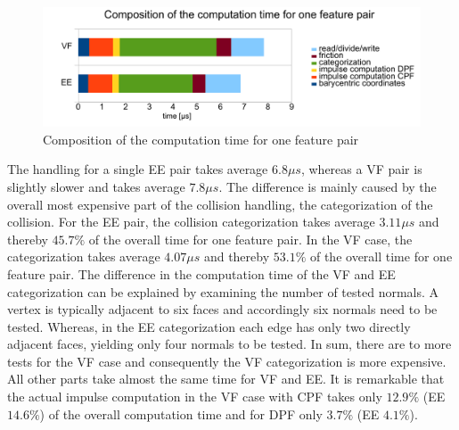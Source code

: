 \begin{figure}[h]
		\centering
			       \includegraphics[width=0.9\linewidth]{pics/pdf/comparison_comptime_cpf_dpf.pdf} 	
\caption{Composition of the computation time for one feature pair}
\label{fig::compCost_scene}
\end{figure}
The handling for a single EE pair takes average $6.8\mu s$, whereas a VF pair is slightly slower and takes average $7.8 \mu s$. The difference is mainly caused by the overall most expensive part of the collision handling, the categorization of the collision. For the EE pair, the collision categorization takes average $3.11 \mu s$ and thereby $45.7\%$ of the overall time for one feature pair. In the VF case, the categorization takes average $4.07\mu s$ and thereby $53.1 \%$ of the overall time for one feature pair.
The difference in the computation time of the VF and EE categorization can be explained by examining the number of tested normals. 
A vertex is typically adjacent to six faces and accordingly six normals need to be tested. Whereas, in the EE categorization each edge has only two directly adjacent faces, yielding only four normals to be tested. In sum, there are to more tests for the VF case and consequently the VF categorization is more expensive.
All other parts take almost the same time for VF and EE.
It is remarkable that the actual impulse computation in the VF case with CPF takes only  $12.9 \%$ (EE $14.6\%$) of the overall computation time and for DPF only $3.7\%$ (EE $4.1\%$).


